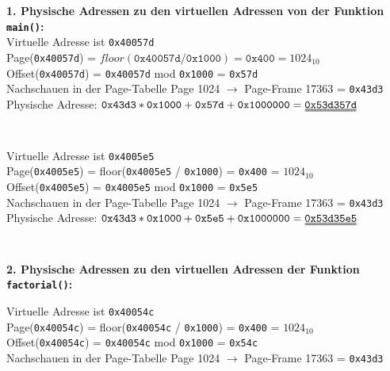 \documentclass{ti2}
\begin{document}
\textbf{1. Physische Adressen zu den virtuellen Adressen von der Funktion \texttt{main()}:}
\bigskip
\\
Virtuelle Adresse ist \texttt{0x40057d}\\

Page(\texttt{0x40057d}) = $floor(\texttt{0x40057d} / \texttt{0x1000}) = \texttt{0x400} = 1024_{10}$\\
Offset(\texttt{0x40057d}) = \texttt{0x40057d} mod \texttt{0x1000} = \texttt{0x57d}\\

Nachschauen in der Page-Tabelle Page 1024 $\rightarrow$ Page-Frame 17363 = \texttt{0x43d3}\\

Physische Adresse: $\texttt{0x43d3} * \texttt{0x1000} + \texttt{0x57d} + \texttt{0x1000000} = \uuline{\texttt{0x53d357d}}$\\
\\
\\

Virtuelle Adresse ist \texttt{0x4005e5}\\

Page(\texttt{0x4005e5}) = floor(\texttt{0x4005e5} / \texttt{0x1000}) = \texttt{0x400} = $1024_{10}$\\
Offset(\texttt{0x4005e5}) = \texttt{0x4005e5} mod \texttt{0x1000} = \texttt{0x5e5}\\

Nachschauen in der Page-Tabelle Page 1024 $\rightarrow$ Page-Frame 17363 = \texttt{0x43d3}\\

Physische Adresse: $\texttt{0x43d3} * \texttt{0x1000} + \texttt{0x5e5} + \texttt{0x1000000} = \uuline{\texttt{0x53d35e5}}$\\
\\
\\

\textbf{2. Physische Adressen zu den virtuellen Adressen der Funktion \texttt{factorial()}:}

Virtuelle Adresse ist \texttt{0x40054c}\\

Page(\texttt{0x40054c}) = floor(\texttt{0x40054c} / \texttt{0x1000}) = \texttt{0x400} = $1024_{10}$\\
Offset(\texttt{0x40054c}) = \texttt{0x40054c} mod \texttt{0x1000} = \texttt{0x54c}\\

Nachschauen in der Page-Tabelle Page 1024 $\rightarrow$ Page-Frame 17363 = \texttt{0x43d3}\\
\end{document}
